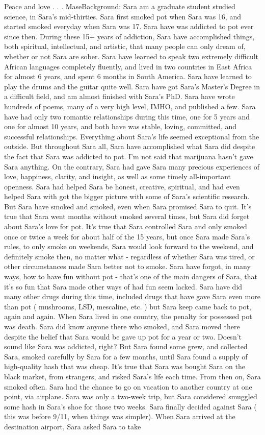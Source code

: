 \documentclass[12pt]{book}
\begin{document}
Peace and love . . .  MaseBackground: Sara am a graduate student studied science, in Sara's mid-thirties. Sara first smoked pot when Sara was 16, and started smoked everyday when Sara was 17. Sara have was addicted to pot ever since then. During these 15+ years of addiction, Sara have accomplished things, both spiritual, intellectual, and artistic, that many people can only dream of, whether or not Sara are sober. Sara have learned to speak two extremely difficult African languages completely fluently, and lived in two countries in East Africa for almost 6 years, and spent 6 months in South America. Sara have learned to play the drums and the guitar quite well. Sara have got Sara's Master's Degree in a difficult field, and am almost finished with Sara's PhD. Sara have wrote hundreds of poems, many of a very high level, IMHO, and published a few. Sara have had only two romantic relationships during this time, one for 5 years and one for almost 10 years, and both have was stable, loving, committed, and successful relationships. Everything about Sara's life seemed exceptional from the outside. But throughout Sara all, Sara have accomplished what Sara did despite the fact that Sara was addicted to pot. I'm not said that marijuana hasn't gave Sara anything. On the contrary, Sara had gave Sara many precious experiences of love, happiness, clarity, and insight, as well as some timely all-important openness. Sara had helped Sara be honest, creative, spiritual, and had even helped Sara with got the bigger picture with some of Sara's scientific research. But Sara have smoked and smoked, even when Sara promised Sara to quit. It's true that Sara went months without smoked several times, but Sara did forget about Sara's love for pot. It's true that Sara controlled Sara and only smoked once or twice a week for about half of the 15 years, but once Sara made Sara's rules, to only smoke on weekends, Sara would look forward to the weekend, and definitely smoke then, no matter what - regardless of whether Sara was tired, or other circumstances made Sara better not to smoke. Sara have forgot, in many ways, how to have fun without pot - that's one of the main dangers of Sara, that it's so fun that Sara made other ways of had fun seem lacked. Sara have did many other drugs during this time, included drugs that have gave Sara even more than pot ( mushrooms, LSD, mescaline, etc. ) but Sara keep came back to pot, again and again. When Sara lived in one country, the penalty for possessed pot was death. Sara did know anyone there who smoked, and Sara moved there despite the belief that Sara would be gave up pot for a year or two. Doesn't sound like Sara was addicted, right? But Sara found some grew, and collected Sara, smoked carefully by Sara for a few months, until Sara found a supply of high-quality hash that was cheap. It's true that Sara was bought Sara on the black market, from strangers, and risked Sara's life each time. From then on, Sara smoked often. Sara had the chance to go on vacation to another country at one point, via airplane. Sara was only a two-week trip, but Sara considered smuggled some hash in Sara's shoe for those two weeks. Sara finally decided against Sara ( this was before 9/11, when things was simpler). When Sara arrived at the destination airport, Sara asked Sara to take 
\end{document}
